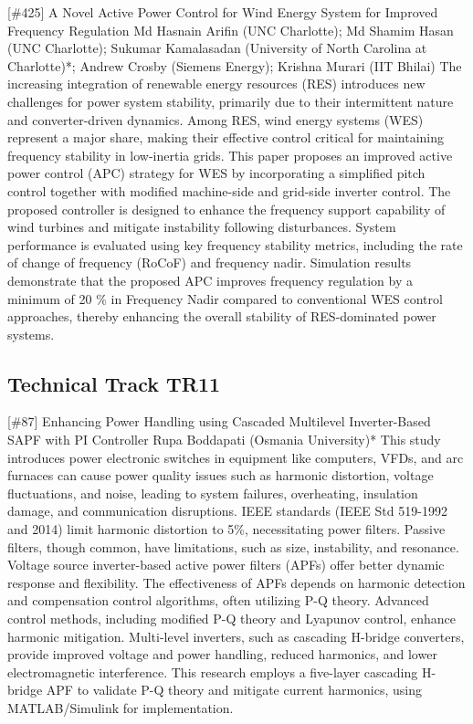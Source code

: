 {} \begin{abstract_online} {[\#425] A Novel Active Power Control for Wind Energy System for Improved Frequency Regulation} {} {Md Hasnain  Arifin (UNC Charlotte); Md Shamim  Hasan (UNC Charlotte); Sukumar Kamalasadan (University of North Carolina at Charlotte)*; Andrew Crosby (Siemens Energy); Krishna Murari (IIT Bhilai)} {} The increasing integration of renewable energy resources (RES) introduces new challenges for power system stability, primarily due to their intermittent nature and converter-driven dynamics. Among RES, wind energy systems (WES) represent a major share, making their effective control critical for maintaining frequency stability in low-inertia grids. This paper proposes an improved active power control (APC) strategy for WES by incorporating a simplified pitch control together with modified machine-side and grid-side inverter control. The proposed controller is designed to enhance the frequency support capability of wind turbines and mitigate instability following disturbances. System performance is evaluated using key frequency stability metrics, including the rate of change of frequency (RoCoF) and frequency nadir. Simulation results demonstrate that the proposed APC improves frequency regulation by a minimum of 20 \% in Frequency Nadir compared to conventional WES control approaches, thereby enhancing the overall stability of RES-dominated power systems. \end{abstract_online} 
\clearpage \subsection{Technical Track TR11}\nopagebreak {} \begin{abstract_online} {[\#87] Enhancing Power Handling using Cascaded Multilevel Inverter-Based SAPF with PI Controller} {} {Rupa Boddapati (Osmania University)*} {} This study introduces power electronic switches in equipment like computers, VFDs, and arc furnaces can cause power quality issues such as harmonic distortion, voltage fluctuations, and noise, leading to system failures, overheating, insulation damage, and communication disruptions. IEEE standards (IEEE Std 519-1992 and 2014) limit harmonic distortion to 5\%, necessitating power filters. Passive filters, though common, have limitations, such as size, instability, and resonance. Voltage source inverter-based active power filters (APFs) offer better dynamic response and flexibility. The effectiveness of APFs depends on harmonic detection and compensation control algorithms, often utilizing P-Q theory. Advanced control methods, including modified P-Q theory and Lyapunov control, enhance harmonic mitigation. Multi-level inverters, such as cascading H-bridge converters, provide improved voltage and power handling, reduced harmonics, and lower electromagnetic interference. This research employs a five-layer cascading H-bridge APF to validate P-Q theory and mitigate current harmonics, using MATLAB/Simulink for implementation. \end{abstract_online} 
